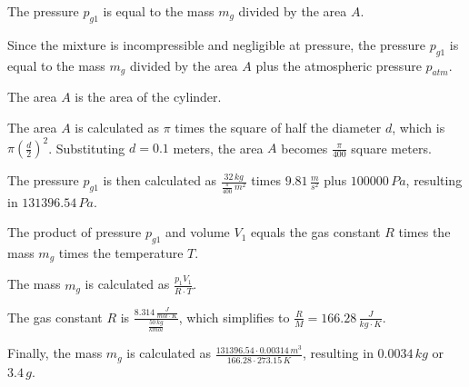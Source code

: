 The pressure \( p_{g1} \) is equal to the mass \( m_g \) divided by the area \( A \).

Since the mixture is incompressible and negligible at pressure, the pressure \( p_{g1} \) is equal to the mass \( m_g \) divided by the area \( A \) plus the atmospheric pressure \( p_{atm} \).

The area \( A \) is the area of the cylinder.

The area \( A \) is calculated as \( \pi \) times the square of half the diameter \( d \), which is \( \pi \left( \frac{d}{2} \right)^2 \). Substituting \( d = 0.1 \) meters, the area \( A \) becomes \( \frac{\pi}{400} \) square meters.

The pressure \( p_{g1} \) is then calculated as \( \frac{32 \, kg}{\frac{\pi}{400} \, m^2} \) times \( 9.81 \, \frac{m}{s^2} \) plus \( 100000 \, Pa \), resulting in \( 131396.54 \, Pa \).

The product of pressure \( p_{g1} \) and volume \( V_1 \) equals the gas constant \( R \) times the mass \( m_g \) times the temperature \( T \).

The mass \( m_g \) is calculated as \( \frac{p_1 V_1}{R \cdot T} \).

The gas constant \( R \) is \( \frac{8.314 \, \frac{J}{mol \cdot K}}{\frac{50 \, kg}{kmol}} \), which simplifies to \( \frac{R}{M} = 166.28 \, \frac{J}{kg \cdot K} \).

Finally, the mass \( m_g \) is calculated as \( \frac{131396.54 \cdot 0.00314 \, m^3}{166.28 \cdot 273.15 \, K} \), resulting in \( 0.0034 \, kg \) or \( 3.4 \, g \).